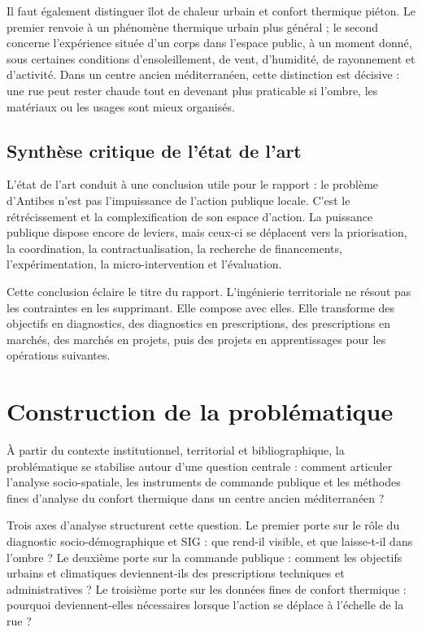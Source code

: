 \documentclass[11pt,a4paper]{report}
\begin{document}
Il faut également distinguer îlot de chaleur urbain et confort thermique piéton. Le premier renvoie à un phénomène thermique urbain plus général ; le second concerne l'expérience située d'un corps dans l'espace public, à un moment donné, sous certaines conditions d'ensoleillement, de vent, d'humidité, de rayonnement et d'activité. Dans un centre ancien méditerranéen, cette distinction est décisive : une rue peut rester chaude tout en devenant plus praticable si l'ombre, les matériaux ou les usages sont mieux organisés.

\subsection{Synthèse critique de l'état de l'art}

L'état de l'art conduit à une conclusion utile pour le rapport : le problème d'Antibes n'est pas l'impuissance de l'action publique locale. C'est le rétrécissement et la complexification de son espace d'action. La puissance publique dispose encore de leviers, mais ceux-ci se déplacent vers la priorisation, la coordination, la contractualisation, la recherche de financements, l'expérimentation, la micro-intervention et l'évaluation.

Cette conclusion éclaire le titre du rapport. L'ingénierie territoriale ne résout pas les contraintes en les supprimant. Elle compose avec elles. Elle transforme des objectifs en diagnostics, des diagnostics en prescriptions, des prescriptions en marchés, des marchés en projets, puis des projets en apprentissages pour les opérations suivantes.

\section{Construction de la problématique}

À partir du contexte institutionnel, territorial et bibliographique, la problématique se stabilise autour d'une question centrale : comment articuler l'analyse socio-spatiale, les instruments de commande publique et les méthodes fines d'analyse du confort thermique dans un centre ancien méditerranéen ?

Trois axes d'analyse structurent cette question. Le premier porte sur le rôle du diagnostic socio-démographique et SIG : que rend-il visible, et que laisse-t-il dans l'ombre ? Le deuxième porte sur la commande publique : comment les objectifs urbains et climatiques deviennent-ils des prescriptions techniques et administratives ? Le troisième porte sur les données fines de confort thermique : pourquoi deviennent-elles nécessaires lorsque l'action se déplace à l'échelle de la rue ?
\end{document}
